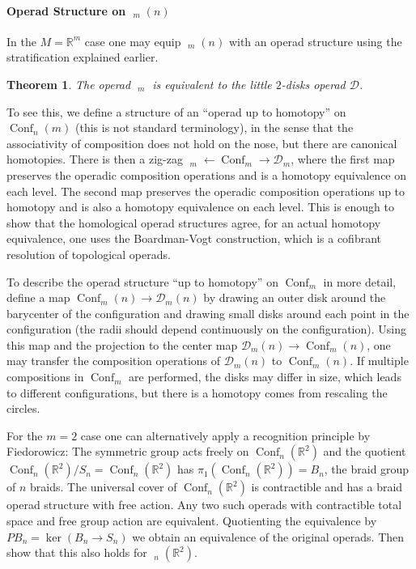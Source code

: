 \documentclass{scrartcl}
\theoremstyle{plain}
\newtheorem{theorem}{Theorem}[section]
\theoremstyle{definition}
\newcommand{\R}{\mathbb R}
\DeclareMathOperator{\Conf}{Conf}
\DeclareMathOperator{\UConf}{Conf}
\DeclareMathOperator{\cConf}{\overline{Conf}}
\begin{document}
\paragraph{Operad Structure on $\cConf_m(n)$} In the $M=\R^m$ case one may equip $\cConf_m(n)$ with an operad structure using the stratification explained earlier. 
\begin{theorem}
    The operad $\cConf_m$ is equivalent to the little $2$-disks operad $\mathcal D$.
\end{theorem}

To see this, we define a structure of an ``operad up to homotopy'' on $\Conf_n(m)$ (this is not standard terminology), in the sense that the associativity of composition does not hold on the nose, but there are canonical homotopies. There is then a zig-zag $\cConf_m \leftarrow \Conf_m \to \mathcal D_m$, where the first map preserves the operadic composition operations and is a homotopy equivalence on each level. The second map preserves the operadic composition operations up to homotopy and is also a homotopy equivalence on each level. This is enough to show that the homological operad structures agree, for an actual homotopy equivalence, one uses the Boardman-Vogt construction, which is a cofibrant resolution of topological operads.

To describe the operad structure ``up to homotopy'' on $\Conf_m$ in more detail, define a map $\Conf_m(n) \to \mathcal D_m(n)$ by drawing an outer disk around the barycenter of the configuration and drawing small disks around each point in the configuration (the radii should depend continuously on the configuration). Using this map and the projection to the center map $\mathcal D_m(n) \to \Conf_m(n)$, one may transfer the composition operations of $\mathcal D_m(n)$ to $\Conf_m(n)$. If multiple compositions in $\Conf_m$ are performed, the disks may differ in size, which leads to different configurations, but there is a homotopy comes from rescaling the circles. 

For the $m=2$ case one can alternatively apply a recognition principle by Fiedorowicz: The symmetric group acts freely on $\Conf_n(\R^2)$ and the quotient $\Conf_n(\R^2) / S_n = \UConf_n(\R^2)$ has $\pi_1(\UConf_n(\R^2)) = B_n$, the braid group of $n$ braids. The universal cover of $\Conf_n(\R^2)$ is contractible and has a braid operad structure with free action. Any two such operads with contractible total space and free group action are equivalent. Quotienting the equivalence by $PB_n = \ker(B_n \to S_n)$ we obtain an equivalence of the original operads. Then show that this also holds for $\cConf_n(\R^2)$.
\end{document}

